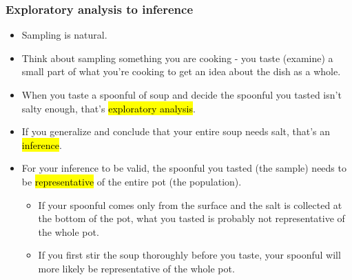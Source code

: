 \documentclass[slidestop,compress,mathserif]{beamer}
\begin{document}
\begin{frame}
\frametitle{Exploratory analysis to inference}

\begin{itemize}

\item Sampling is natural.

\pause

\item Think about sampling something you are cooking - you taste (examine) a small part of what you're cooking to get an idea about the dish as a whole.

\pause

\item When you taste a spoonful of soup and decide the spoonful you tasted isn't salty enough, that's \hl{exploratory analysis}.

\pause

\item If you generalize and conclude that your entire soup needs salt, that's an \hl{inference}.

\pause

\item For your inference to be valid, the spoonful you tasted (the sample) needs to be \hl{representative} of the entire pot (the population).

\begin{itemize}
\item If your spoonful comes only from the surface and the salt is collected at the bottom of the pot, what you tasted is probably not representative of the whole pot.
\item If you first stir the soup thoroughly before you taste, your spoonful will more likely be representative of the whole pot.
\end{itemize}

\end{itemize}

\end{frame}

\end{document}

